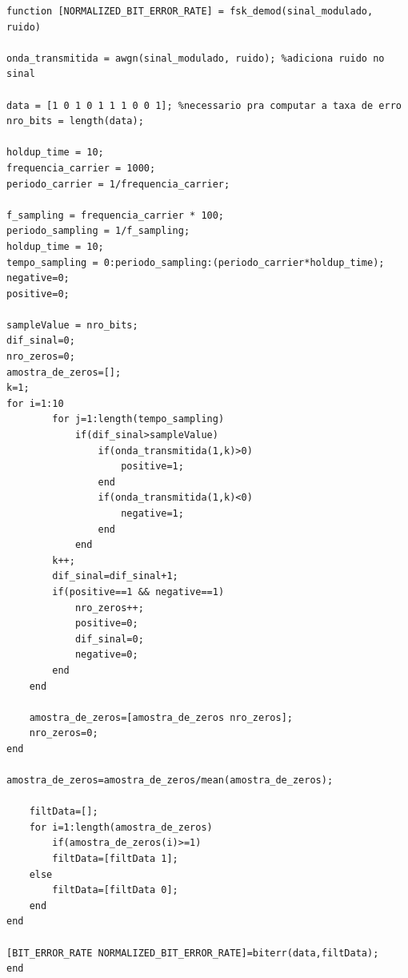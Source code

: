 \documentclass[11pt,a4paper]{report}
\begin{document}
\begin{verbatim}
function [NORMALIZED_BIT_ERROR_RATE] = fsk_demod(sinal_modulado, ruido)

onda_transmitida = awgn(sinal_modulado, ruido); %adiciona ruido no sinal

data = [1 0 1 0 1 1 1 0 0 1]; %necessario pra computar a taxa de erro
nro_bits = length(data);

holdup_time = 10;
frequencia_carrier = 1000; 
periodo_carrier = 1/frequencia_carrier;

f_sampling = frequencia_carrier * 100;
periodo_sampling = 1/f_sampling;
holdup_time = 10;
tempo_sampling = 0:periodo_sampling:(periodo_carrier*holdup_time);
negative=0;
positive=0;

sampleValue = nro_bits;
dif_sinal=0;
nro_zeros=0;
amostra_de_zeros=[];
k=1;
for i=1:10
		for j=1:length(tempo_sampling)
			if(dif_sinal>sampleValue)
				if(onda_transmitida(1,k)>0)
					positive=1;    
				end
				if(onda_transmitida(1,k)<0)
					negative=1;
				end
			end
		k++;
		dif_sinal=dif_sinal+1;
		if(positive==1 && negative==1)
			nro_zeros++;
			positive=0;
			dif_sinal=0;
			negative=0;
		end
	end

	amostra_de_zeros=[amostra_de_zeros nro_zeros];
	nro_zeros=0;     
end

amostra_de_zeros=amostra_de_zeros/mean(amostra_de_zeros);

	filtData=[];
	for i=1:length(amostra_de_zeros)
		if(amostra_de_zeros(i)>=1)
		filtData=[filtData 1];
	else
		filtData=[filtData 0];
	end
end

[BIT_ERROR_RATE NORMALIZED_BIT_ERROR_RATE]=biterr(data,filtData);
end

\end{verbatim}

	
\end{document}
